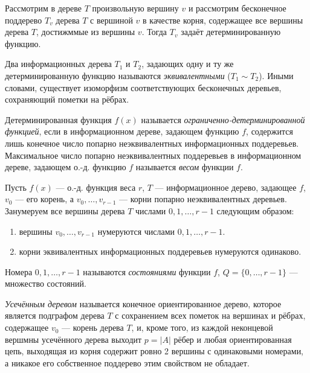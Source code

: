 Рассмотрим в дереве $T$ произвольную вершину $v$ и рассмотрим бесконечное поддерево $T_v$ дерева $T$ с вершиной $v$ в качестве корня, содержащее все вершины дерева $T$, достижммые из вершины $v$. Тогда $T_v$ задаёт детерминированную функцию.

\begin{definition}
    Два информационных дерева $T_1$ и $T_2$, задающих одну и ту же детерминированную функцию называются \textit{эквивалентными} ($T_1 \sim T_2$). Иными словами, существует изоморфизм соответствующих бесконечных деревьев, сохраняющий пометки на рёбрах.
\end{definition}

\begin{definition}
    Детерминированная функция $f(x)$ называется \textit{ограниченно-детерминированной функцией}, если в информационном дереве, задающем функцию $f$, содержится лишь конечное число попарно неэквивалентных информационных поддеревьев. Максимальное число попарно неэквивалентных поддеревьев в информационном дереве, задающем о.-д. функцию $f$ называется \textit{весом} функции $f$.
\end{definition}

Пусть $f(x)$ --- о.-д. функция веса $r$, $T$ --- информационное дерево, задающее $f$, $v_0$ --- его корень, а $v_0, \ldots, v_{r-1}$ --- корни попарно неэквивалентных деревьев. Занумеруем все вершины дерева $T$ числами $0, 1, \ldots, r-1$ следующим образом:
\begin{enumerate}[nolistsep]
    \item вершины $v_0, \ldots, v_{r-1}$ нумеруются числами $0, 1, \ldots, r-1$.
    \item корни эквивалентных информационных поддеревьев нумеруются одинаково.
\end{enumerate}

\begin{definition}
    Номера $0, 1, \ldots, r-1$ называются \textit{состояниями} функции $f$, $Q=\{0, \ldots, r-1\}$ --- множество состояний.
\end{definition}

\begin{definition}
    \textit{Усечённым деревом} называется конечное ориентированное дерево, которое является подграфом дерева $T$ с сохранением всех пометок на вершинах и рёбрах, содержащее $v_0$ --- корень дерева $T$, и, кроме того, из каждой неконцевой вершмны усечённого дерева выходит $p=|A|$ рёбер и любая ориентированная цепь, выходящая из корня содержит ровно 2 вершины с одинаковыми номерами, а никакое его собственное поддерево этим свойством не обладает.
\end{definition}

